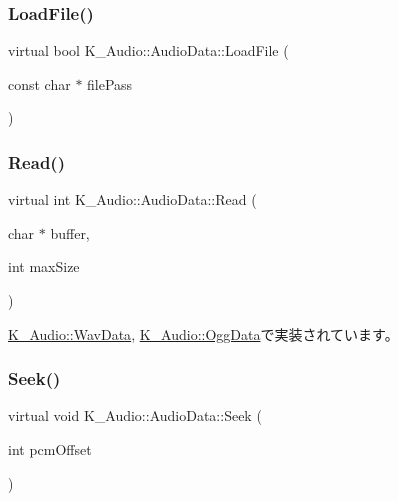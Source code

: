 \subsubsection{\texorpdfstring{Load\+File()}{LoadFile()}}
{\footnotesize\ttfamily virtual bool K\+\_\+\+Audio\+::\+Audio\+Data\+::\+Load\+File (\begin{DoxyParamCaption}\item[{const char $\ast$}]{file\+Pass }\end{DoxyParamCaption})\hspace{0.3cm}{\ttfamily [pure virtual]}}

\mbox{\label{class_k___audio_1_1_audio_data_af42b123ad2ce45867401d697fd572392}} 
\subsubsection{\texorpdfstring{Read()}{Read()}}
{\footnotesize\ttfamily virtual int K\+\_\+\+Audio\+::\+Audio\+Data\+::\+Read (\begin{DoxyParamCaption}\item[{char $\ast$}]{buffer,  }\item[{int}]{max\+Size }\end{DoxyParamCaption})\hspace{0.3cm}{\ttfamily [pure virtual]}}



\mbox{\hyperlink{class_k___audio_1_1_wav_data_a9b64967d83ac218c71949335d0583e69}{K\+\_\+\+Audio\+::\+Wav\+Data}}, \mbox{\hyperlink{class_k___audio_1_1_ogg_data_ac4c50916e0f2eaa384539b2dbedc1d6e}{K\+\_\+\+Audio\+::\+Ogg\+Data}}で実装されています。

\mbox{\label{class_k___audio_1_1_audio_data_a1ba3ab1b4bae0b460d26278cb29ce16e}} 
\subsubsection{\texorpdfstring{Seek()}{Seek()}}
{\footnotesize\ttfamily virtual void K\+\_\+\+Audio\+::\+Audio\+Data\+::\+Seek (\begin{DoxyParamCaption}\item[{int}]{pcm\+Offset }\end{DoxyParamCaption})\hspace{0.3cm}{\ttfamily [pure virtual]}}



